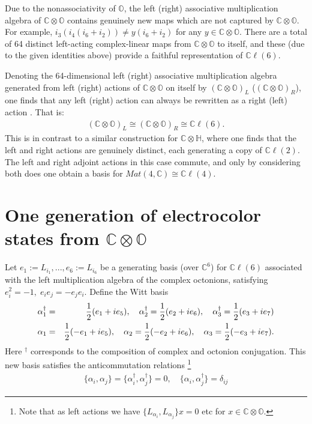 \documentclass{article}
\newcommand{\bb}[1]{\mathbb{#1}}
\newcommand{\CCl}{\mathbb{C}\ell}
\begin{document}
Due to the nonassociativity of $\bb{O}$, the left (right) associative multiplication algebra of $\bb{C}\otimes\bb{O}$ contains genuinely new maps which are not captured by $\bb{C}\otimes\bb{O}$. For example, $i_3(i_4(i_6+i_2))\neq y(i_6+i_2)$ for any $y\in\bb{C}\otimes\bb{O}$. 
There are a total of 64 distinct left-acting complex-linear maps from $\bb{C}\otimes\bb{O}$ to itself, and these (due to the given identities above) provide a faithful representation of $\CCl(6)$. 

Denoting the 64-dimensional left (right) associative multiplication algebra generated from left (right) actions of $\bb{C}\otimes\bb{O}$ on itself by $(\bb{C}\otimes\bb{O})_L$ ($(\bb{C}\otimes\bb{O})_R$), one finds that any left (right) action can always be rewritten as a right (left) action \cite{dixon2013division}. That is: 
\begin{eqnarray}
(\bb{C}\otimes\mathbb{O})_L\cong (\bb{C}\otimes\mathbb{O})_R\cong \bb{C}\ell(6).
\end{eqnarray}
This is in contrast to a similar construction for $\bb{C}\otimes\bb{H}$, where one finds that the left and right actions are genuinely distinct, each generating a copy of $\bb{C}\ell(2)$. The left and right adjoint actions in this case commute, and only by considering both does one obtain a basis for $Mat(4,\bb{C})\cong\bb{C}\ell(4)$. 



\section{One generation of electrocolor states from $\bb{C}\otimes\bb{O}$}\label{Furey}

Let $e_1:= L_{i_1},...,e_6:=L_{i_6}$ be a generating basis (over $\bb{C}^6$) for $\bb{C}\ell(6)$ associated with the left multiplication algebra of the complex octonions, satisfying $e_i^2=-1,\;e_ie_j=-e_je_i$. Define the Witt basis
\begin{eqnarray}\notag
\alpha_1^\dagger &=& \frac{1}{2}(e_1+ie_5),\quad \alpha_2^\dagger = \frac{1}{2}(e_2+ie_6),\quad \alpha_3^\dagger = \frac{1}{2}(e_3+ie_7)\\\notag
\alpha_1 &=& \frac{1}{2}(-e_1+ie_5), \quad \alpha_2 = \frac{1}{2}(-e_2+ie_6),\quad \alpha_3 = \frac{1}{2}(-e_3+ie_7).
\end{eqnarray}
Here ${}^{\dagger}$ corresponds to the composition of complex and octonion conjugation. This new basis satisfies the anticommutation relations \footnote{Note that as left actions we have $\{L_{\alpha_i},L_{\alpha_j}\}x=0$ etc for $x\in\bb{C}\otimes\bb{O}$.}
\begin{eqnarray}
    \{\alpha_i,\alpha_j\}=\{\alpha_i^{\dagger},\alpha_j^{\dagger}\}=0, \quad\{\alpha_i,\alpha_j^{\dagger}\}=\delta_{ij}
\end{eqnarray}
\end{document}
